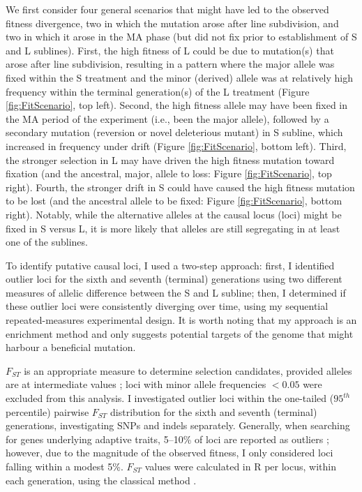 We first consider four general scenarios that might have led to the observed fitness divergence, two in which the mutation arose after line subdivision, and two in which it arose in the MA phase (but did not fix prior to establishment of S and L sublines). First, the high fitness of L could be due to mutation(s) that arose after line subdivision, resulting in a pattern where the major allele was fixed within the S treatment and the minor (derived) allele was at relatively high frequency within the terminal generation(s) of the L treatment (Figure \ref{fig:FitScenario}, top left). Second, the high fitness allele may have been fixed in the MA period of the experiment (i.e., been the major allele), followed by a secondary mutation (reversion or novel deleterious mutant) in S subline, which increased in frequency under drift (Figure \ref{fig:FitScenario}, bottom left). Third, the stronger selection in L may have driven the high fitness mutation toward fixation (and the ancestral, major, allele to loss: Figure \ref{fig:FitScenario}, top right). Fourth, the stronger drift in S could have caused the high fitness mutation to be lost (and the ancestral allele to be fixed: Figure \ref{fig:FitScenario}, bottom right). Notably, while the alternative alleles at the causal locus (loci) might be fixed in S versus L, it is more likely that alleles are still segregating in at least one of the sublines.\par

To identify putative causal loci, I used a two-step approach: first, I identified outlier loci for the sixth and seventh (terminal) generations using two different measures of allelic difference between the S and L subline; then, I determined if these outlier loci were consistently diverging over time, using my sequential repeated-measures experimental design. It is worth noting that my approach is an enrichment method and only suggests potential targets of the genome that might harbour a beneficial mutation. \par

$F_{ST}$ is an appropriate measure to determine selection candidates, provided alleles are at intermediate values \citep[MAF $\geq$ 0.05,][]{Bern19}; loci with minor allele frequencies $< 0.05$ were excluded from this analysis. I investigated outlier loci within the one-tailed ($95^{th}$ percentile) pairwise $F_{ST}$ distribution for the sixth and seventh (terminal) generations, investigating SNPs and indels separately. Generally, when searching for genes underlying adaptive traits, 5–10\% of loci are reported as outliers \citep{Stin08, Nosi09}; however, due to the magnitude of the observed fitness, I only considered loci falling within a modest 5\%. $F_{ST}$ values were calculated in R \citep[v 4.2.2,][]{R} per locus, within each generation, using the classical method \citep{Weir84,Hart97}.\par
 
